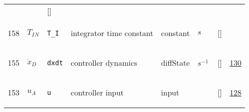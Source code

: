 \begin{longtable}{|p{1cm}|p{3cm}|p{3cm}|p{7cm}|p{3.0cm}|p{3cm}|p{2cm}|p{1cm}|}
             & $  $
             & []
             & \\
    158
             & \hypertarget{"v:158"}{ $ {T_I}{_{N}} $}
             & \verb|T_I|
             & integrator time constant
             & \begin{lay}constant \end{lay}
             & $ s \, $
             & []
             & \\
    155
             & \hypertarget{"v:155"}{ $ {\dot{x}}{_{D}} $}
             & \verb|dxdt|
             & controller dynamics
             & \begin{lay}diffState \end{lay}
             & $ s^{-1} \, $
             & []
             & \hyperlink{"e:130"}{ 130 }
                 \\
    153
             & \hypertarget{"v:153"}{ $ {u}{_{A}} $}
             & \verb|u|
             & controller input
             & \begin{lay}input \end{lay}
             & $  $
             & []
             & \hyperlink{"e:128"}{ 128 }
                 \\
    \end{longtable}